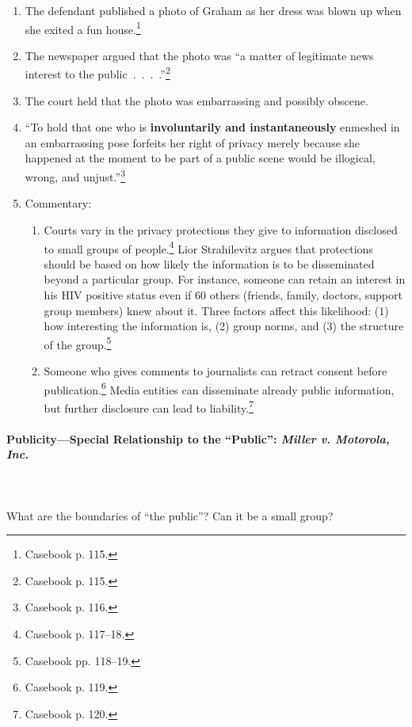 \begin{enumerate}
    \item The defendant published a photo of Graham as her dress was blown up 
    when she exited a fun house.\footnote{Casebook p. 115.}
    \item The newspaper argued that the photo was ``a matter of legitimate news 
    interest to the public~.~.~.~.''\footnote{Casebook p. 115.}
    \item The court held that the photo was embarrassing and possibly obscene.
    \item ``To hold that one who is \textbf{involuntarily and instantaneously} 
    enmeshed in an embarrassing pose forfeits her right of privacy merely 
    because she happened at the moment to be part of a public scene would be 
    illogical, wrong, and unjust.''\footnote{Casebook p. 116.}
    \item Commentary:
    \begin{enumerate}
        \item Courts vary in the privacy protections they give to information 
        disclosed to small groups of people.\footnote{Casebook p. 117--18.} Lior 
        Strahilevitz argues that protections should be based on how likely the 
        information is to be disseminated beyond a particular group. For 
        instance, someone can retain an interest in his HIV positive status even 
        if 60 others (friends, family, doctors, support group members) knew 
        about it. Three factors affect this likelihood: (1) how interesting the 
        information is, (2) group norms, and (3) the structure of the 
        group.\footnote{Casebook pp. 118--19.}
        \item Someone who gives comments to journalists can retract consent 
        before publication.\footnote{Casebook p. 119.} Media entities can 
        disseminate already public information, but further disclosure can lead 
        to liability.\footnote{Casebook p. 120.}
    \end{enumerate}
\end{enumerate}

\paragraph{Publicity---Special Relationship to the ``Public'': \emph{Miller v. 
Motorola, Inc.}}
~\\\\
What are the boundaries of ``the public''? Can it be a small group?

